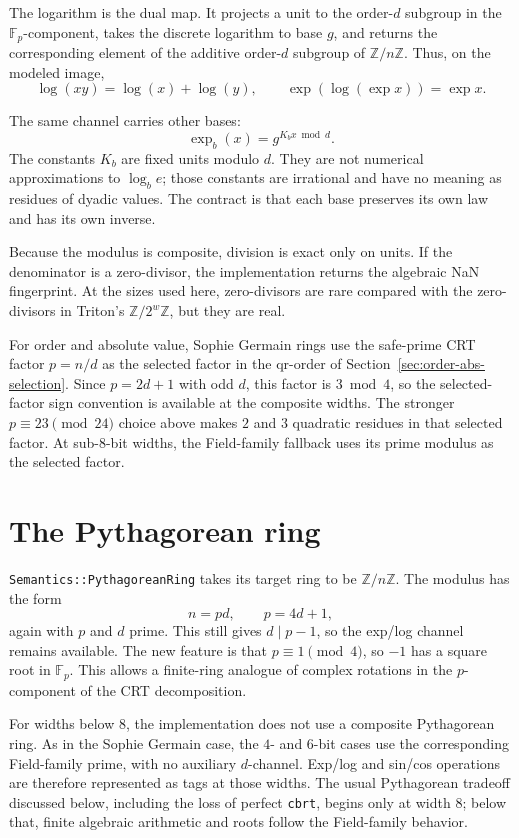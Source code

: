 \documentclass[11pt]{article}
\newcommand{\Z}{\mathbb{Z}}
\newcommand{\F}{\mathbb{F}}
\theoremstyle{plain}
\begin{document}
The logarithm is the dual map.  It projects a unit to the order-\(d\) subgroup in
the \(\F_p\)-component, takes the discrete logarithm to base \(g\), and returns
the corresponding element of the additive order-\(d\) subgroup of \(\Z/n\Z\).
Thus, on the modeled image,
\[
  \log(xy)=\log(x)+\log(y),\qquad
  \exp(\log(\exp x))=\exp x.
\]

The same channel carries other bases:
\[
  \exp_b(x)=g^{K_b x\bmod d}.
\]
The constants \(K_b\) are fixed units modulo \(d\).  They are not numerical
approximations to \(\log_b e\); those constants are irrational and have no
meaning as residues of dyadic values.  The contract is that each base preserves
its own law and has its own inverse.

Because the modulus is composite, division is exact only on units.  If the
denominator is a zero-divisor, the implementation returns the algebraic NaN
fingerprint.  At the sizes used here, zero-divisors are rare compared with the
zero-divisors in Triton's \(\Z/2^w\Z\), but they are real.

For order and absolute value, Sophie Germain rings use the safe-prime CRT
factor \(p=n/d\) as the selected factor in the qr-order of
Section~\ref{sec:order-abs-selection}.  Since \(p=2d+1\) with odd \(d\), this
factor is \(3\bmod4\), so the selected-factor sign convention is available at
the composite widths.  The stronger \(p\equiv23\pmod {24}\) choice above makes
\(2\) and \(3\) quadratic residues in that selected factor.  At sub-\(8\)-bit
widths, the Field-family fallback uses its prime modulus as the selected factor.

\section{The Pythagorean ring}

\texttt{Semantics::PythagoreanRing} takes its target ring to be
\(\Z/n\Z\).  The modulus has the form
\[
  n=pd,\qquad p=4d+1,
\]
again with \(p\) and \(d\) prime.  This still gives \(d\mid p-1\), so the
exp/log channel remains available.  The new feature is that
\(p\equiv 1\pmod 4\), so \(-1\) has a square root in \(\F_p\).  This allows a
finite-ring analogue of complex rotations in the \(p\)-component of the CRT
decomposition.

For widths below \(8\), the implementation does not use a composite Pythagorean
ring.  As in the Sophie Germain case, the \(4\)- and \(6\)-bit cases use the
corresponding Field-family prime, with no auxiliary \(d\)-channel.  Exp/log and
sin/cos operations are therefore represented as tags at those widths.  The usual
Pythagorean tradeoff discussed below, including the loss of perfect
\texttt{cbrt}, begins only at width \(8\); below that, finite algebraic
arithmetic and roots follow the Field-family behavior.
\end{document}

